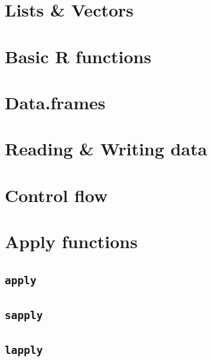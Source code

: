 \documentclass[
]{book}
\begin{document}
\hypertarget{r-lists-and-vectors}{%
\section{Lists \& Vectors}\label{r-lists-and-vectors}}

\hypertarget{r-basic-functions}{%
\section{Basic R functions}\label{r-basic-functions}}

\hypertarget{r-data-frames}{%
\section{Data.frames}\label{r-data-frames}}

\hypertarget{r-reading-and-writing-data}{%
\section{Reading \& Writing data}\label{r-reading-and-writing-data}}

\hypertarget{r-control-flow}{%
\section{Control flow}\label{r-control-flow}}

\hypertarget{r-apply-functions}{%
\section{Apply functions}\label{r-apply-functions}}

\hypertarget{r-apply}{%
\subsection{\texorpdfstring{\texttt{apply}}{apply}}\label{r-apply}}

\hypertarget{r-sapply}{%
\subsection{\texorpdfstring{\texttt{sapply}}{sapply}}\label{r-sapply}}

\hypertarget{r-lapply}{%
\subsection{\texorpdfstring{\texttt{lapply}}{lapply}}\label{r-lapply}}
\end{document}
